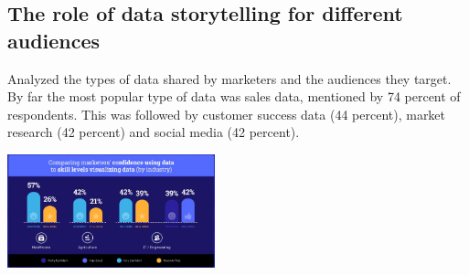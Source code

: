 \documentclass{article}
\begin{document}
\begin{multicols}{2}
\subsection{The role of data storytelling for different audiences}
 Analyzed the types of data shared by marketers and the audiences they target.
 By far the most popular type of data was sales data, mentioned by 74 percent of respondents. This was followed by customer success data (44 percent), market research (42 percent) and social media (42 percent).

\includegraphics[width=6cm]{./images/3.jpg} 

 
 

\end{multicols}
\end{document}
